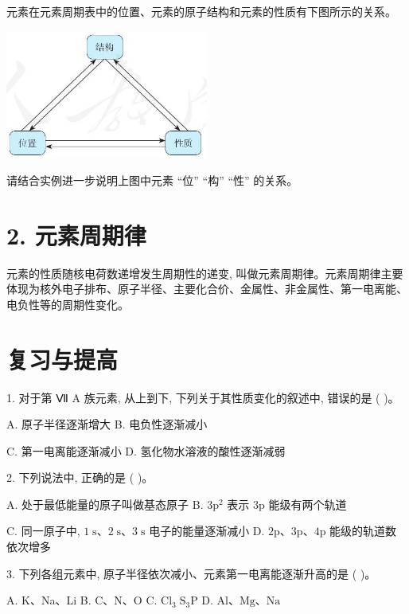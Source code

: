 \documentclass[10pt]{article}
\begin{document}
元素在元素周期表中的位置、元素的原子结构和元素的性质有下图所示的关系。

\begin{center}
\includegraphics[max width=0.5\textwidth]{images/0190e026-5a11-7df7-bd27-54d09026ba7a_33_987268.jpg}
\end{center}

请结合实例进一步说明上图中元素 “位” “构” “性” 的关系。

\section*{2. 元素周期律}

元素的性质随核电荷数递增发生周期性的递变, 叫做元素周期律。元素周期律主要体现为核外电子排布、原子半径、主要化合价、金属性、非金属性、第一电离能、电负性等的周期性变化。

\section*{复习与提高}

1. 对于第 Ⅶ A 族元素, 从上到下, 下列关于其性质变化的叙述中, 错误的是 ( )。

A. 原子半径逐渐增大 B. 电负性逐渐减小

C. 第一电离能逐渐减小 D. 氢化物水溶液的酸性逐渐减弱

2. 下列说法中, 正确的是 ( )。

A. 处于最低能量的原子叫做基态原子 B. \(3{\mathrm{p}}^{2}\) 表示 \(3\mathrm{p}\) 能级有两个轨道

C. 同一原子中, \(1\mathrm{\;s}\text{、}2\mathrm{\;s}\text{、}3\mathrm{\;s}\) 电子的能量逐渐减小 D. \(2\mathrm{p}\text{、}3\mathrm{p}\text{、}4\mathrm{p}\) 能级的轨道数依次增多

3. 下列各组元素中, 原子半径依次减小、元素第一电离能逐渐升高的是 ( )。

A. K、Na、Li B. \(\mathrm{C}\text{、}\mathrm{N}\text{、}\mathrm{O}\) C. \({\mathrm{{Cl}}}_{3}{\mathrm{\;S}}_{3}\mathrm{P}\) D. \(\mathrm{{Al}}\text{、}\mathrm{{Mg}}\text{、}\mathrm{{Na}}\)
\end{document}
